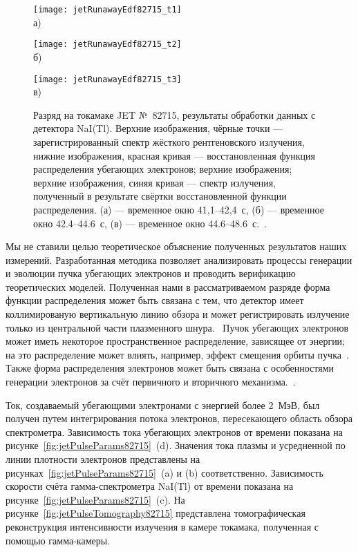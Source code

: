 \begin{figure}[ht]
    \begin{minipage}[b][][b]{0.42\linewidth}\centering
        \texttt{[image: jetRunawayEdf82715\_t1]} \\ а)
    \end{minipage}
    \hfill
    \begin{minipage}[b][][b]{0.42\linewidth}\centering
        \texttt{[image: jetRunawayEdf82715\_t2]} \\ б)
    \end{minipage}
    \hfill
    \begin{minipage}[b][][b]{0.42\linewidth}\centering
        \texttt{[image: jetRunawayEdf82715\_t3]} \\ в)
    \end{minipage}
    \caption{ Разряд на токамаке JET №~82715, результаты обработки данных с детектора NaI(Tl). Верхние изображения, чёрные точки --- зарегистрированный спектр жёсткого рентгеновского излучения, нижние изображения, красная кривая --- восстановленная функция распределения убегающих электронов; верхние изображения; верхние изображения, синяя кривая --- спектр излучения, полученный в результате свёртки восстановленной функции распределения. (а) --- временное окно 41,1--42,4~с, (б) --- временное окно 42.4--44.6~с, (в) --- временное окно 44.6--48.6~с.~\cite{Shevelev2013}. }
    \label{fig:jetRunawayEdf82715}
\end{figure}


Мы не ставили целью теоретическое объяснение полученных результатов наших измерений. Разработанная методика позволяет анализировать процессы генерации и эволюции пучка убегающих электронов и проводить верификацию теоретических моделей. Полученная нами в рассматриваемом разряде форма функции распределения может быть связана с тем, что детектор имеет коллимированую вертикальную линию обзора и может регистрировать излучение только из центральной части плазменного шнура.~\cite{Shevelev2013} Пучок убегающих электронов может иметь некоторое пространственное распределение, зависящее от энергии; на это распределение может влиять, например, эффект смещения орбиты пучка~\cite{Knoepfel1979}. Также форма распределения электронов может быть связана с особенностями генерации электронов за счёт первичного и вторичного механизма.~\cite{Helander2002}.

Ток, создаваемый убегающими электронами с энергией более 2~МэВ, был получен путем интегрирования потока электронов, пересекающего область обзора спектрометра. Зависимость тока убегающих электронов от времени показана на рисунке~\ref{fig:jetPulseParams82715}~(d). Значения тока плазмы и усредненной по линии плотности электронов представлены на рисунках~\ref{fig:jetPulseParams82715}~(a) и (b) соответственно. Зависимость скорости счёта гамма-спектрометра NaI(Tl) от времени показана на рисунке~\ref{fig:jetPulseParams82715}~(c). На рисунке~\ref{fig:jetPulseTomography82715} представлена томографическая реконструкция интенсивности излучения в камере токамака, полученная с помощью гамма-камеры.


